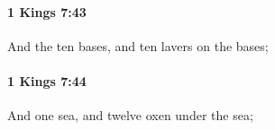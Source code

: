 		\paragraph{1 Kings 7:43} %
			\label{1KINGS-7-43}

			And the ten bases, and ten lavers on the bases;


		\paragraph{1 Kings 7:44} %
			\label{1KINGS-7-44}

			And one sea, and twelve oxen under the sea;


